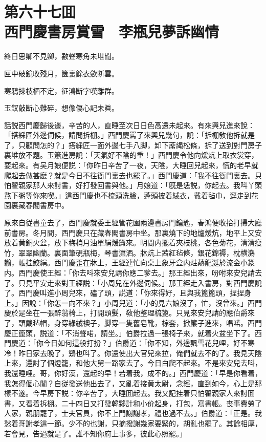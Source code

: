 
\chapter*{第六十七囬　\\西門慶書房賞雪　李瓶兒夢訴幽情}


\begin{myquote}
終日思卿不見卿，數聲寒角未堪聞。

匣中破鏡收殘月，篋裏餘衣歛断雲。

寒鴉揀枝栖不定，征鴻断字嘆離群。

玉釵敲断心難碎，想像傷心記未眞。
\end{myquote}

話説西門慶歸後邊，辛苦的人，直睡至次日日色高還未起來。有來興兒進來說：「搭綵匠外邊伺候，請問拆棚。」西門慶罵了來興兒幾句，說：「拆棚敎他拆就是了，只顧問怎的？」搭綵匠一面外邊七手八脚，卸下蓆䋲松條，拆了送到對門房子裏堆放不題。玉簫進房說：「天氣好不陰的重！」西門慶令他向煖炕上取衣裳穿，要起來。有吴月娘便説：「你昨日辛苦了一夜，天陰，大睡回兒起來，慌的老早就爬起去做甚麽？就是今日不往衙門裏去也罷了。」西門慶道：「我不往衙門裏去。只怕翟親家那人來討書，好打發回書與他。」月娘道：「旣是恁説，你起去。我呌丫頭熬下粥等你來喫。」這西門慶也不梳頭洗臉，蓬頭披着絨衣，戴着毡巾，逕走到花園裏藏春閣書房中。

原來自従書童去了，西門慶就委王經管花園兩邊書房門鑰匙，春鴻便收拾打掃大廳前書房。冬月間，西門慶只在藏春閣書房中坐。那裏燒下的地爐煖炕，地平上又安放着黄銅火盆，放下梅梢月油單絹煖簾來。明間内擺着夾枝桃，各色菊花，清清瘦竹，翠翠幽蘭。裏面筆硯瓶梅，琴書瀟洒。牀炕上茜紅毡條，銀花錦褥，枕横鸂鶒，帳挂鮫絹。西門慶歪在牀上，王經連忙向桌上象牙盒内炷爇龍涎於流金小篆内。西門慶使王經：「你去呌來安兒請你應二爹去。」那王經出來，吩咐來安兒請去了。只見平安走來對王經説：「小周兒在外邊伺候。」那王經走入書房，對西門慶說了。西門慶叫進小周兒來，磕了頭，説道：「你來得好，且與我篦篦頭，捏捏身上。」因說：「你怎一向不來？」小周兒道：「小的見六娘沒了，忙，沒曾來。」西門慶於是坐在一張醉翁椅上，打開頭髮，敎他整理梳篦。只見來安兒請的應伯爵來了，頭戴毡帽，身穿綠絨襖子，脚穿一隻舊皂靴，棕套，掀簾子進來，唱喏。西門慶正篦頭，説道：「不消聲喏，請坐。」伯爵拉過一張椅子來，就着火盆坐下了。西門慶道：「你今日如何這般打扮？」伯爵道：「你不知，外邊飄雪花兒哩，好不寒冷！昨日家去晚了，鷄也呌了。你還使出大官兒來拉，俺們就去不的了。我見天陰上來，還討了個燈籠，和他大舅一路家去了。今日白爬不起來。不是來安兒去呌，我還睡哩。哥，你好漢，還起的早！若着我，成不的。」西門慶道：「早是你看着，我怎得個心閒？自従發送他出去了，又亂着接黄太尉，念經，直到如今，心上是那樣不遂。今早房下説：你辛苦了，大睡囬起去。我又記挂着只怕翟親家人來討囬書，又看着拆棚。二十四日又打發韓夥計和小价起身，打包，寫書帳。丧事費勞了人家，親朋罷了，士夫官員，你不上門謝謝孝，禮也過不去。」伯爵道：「正是。我愁着哥謝孝這一節。少不的也謝，只摘撥謝幾家要緊的，胡亂也罷了。其餘相厚，若會見，告過就是了。誰不知你府上事多，彼此心照罷。」

